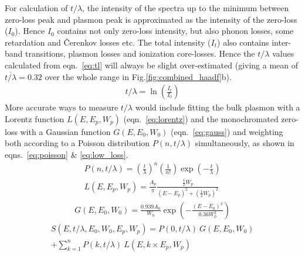 \documentclass[%
aip,
rsi,%
 amsmath,amssymb,%
 reprint,%
]{revtex4-1}
\begin{document}
For calculation of $t/\lambda$, the intensity of the spectra up to the minimum between zero-loss peak and plasmon peak is approximated as the intensity of the zero-loss ($I_0$). Hence $I_0$ contains not only zero-loss intensity, but also phonon losses, some retardation and \v{C}erenkov losses etc. The total intensity ($I_t$) also contains inter-band transitions, plasmon losses and ionization core-losses. Hence the $t/\lambda$ values calculated from eqn.~\ref{eq:tl} will always be slight over-estimated (giving a mean of $\overline{t/\lambda}=0.32$ over the whole range in Fig.\ref{fig:combined_haadf}b).
\begin{eqnarray}
	t/\lambda = \operatorname{ln}\left(\frac{I_t}{I_0}\right)
    \label{eq:tl}
\end{eqnarray}
More accurate ways to measure $t/\lambda$ would include fitting the bulk plasmon with a Lorentz function $L(E,E_p,W_p)$ (eqn.~\ref{eq:lorentz}) and the monochromated zero-loss with a Gaussian function $G(E,E_0,W_0)$ (eqn.~\ref{eq:gauss}) and weighting both according to a Poisson distribution $P(n,t/\lambda)$ simultaneously, as shown in eqns.~\ref{eq:poisson} \& \ref{eq:low_loss}.
\begin{eqnarray}
	P(n,t/\lambda) = \left(\frac{t}{\lambda}\right)^n\left(\frac{1}{n!}\right)\operatorname{exp}\left(-\frac{t}{\lambda}\right)
    \label{eq:poisson}\\
	L(E,E_p,W_p) = \frac{A_p}{\pi} \frac{\frac{1}{2}W_p}{(E-E_p)^2+\left(\frac{1}{2}W_p\right)^2}
    \label{eq:lorentz}
\end{eqnarray}
\begin{align}
	G(E,E_0,W_0) = \frac{0.939A_0}{W_0}\operatorname{exp}\left(-\frac{(E-E_0)^2}{0.36W_0^2}\right)
    \label{eq:gauss}
\end{align}
\begin{align}
	S(E,t/\lambda,E_0,W_0,E_p,W_p) = P(0,t/\lambda)~G(E,E_0,W_0) \nonumber \\
     +\sum_{k=1}^{n}P(k,t/\lambda)~L(E,k\times E_p,W_p)    \label{eq:low_loss}
\end{align}
\end{document}
